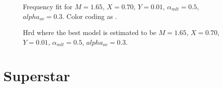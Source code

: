 \begin{figure}[htbp]
	\centering
	\caption{Frequency fit for $M=1.65$\msun, $X=0.70$, $Y=0.01$, $\alpha_{mlt} = 0.5$, $alpha_{ov} = 0.3$. Color coding as . }
	\label{freqfit}
\end{figure}
\begin{figure}[htbp]
	\centering
	\caption{Hrd where the best model is estimated to be $M=1.65$\msun, $X=0.70$, $Y=0.01$, $\alpha_{mlt} = 0.5$, $alpha_{ov} = 0.3$.}
	\label{hrd44old}
\end{figure}

\section{Superstar}

